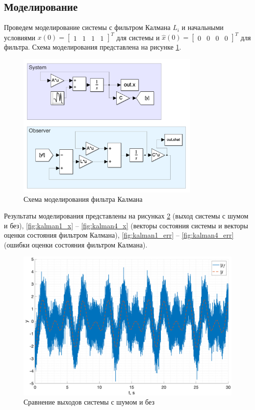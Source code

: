 \subsection{Моделирование}
Проведем моделирование системы с фильтром Калмана $L_i$ и начальными условиями $x(0) = \begin{bmatrix} 1 & 1 & 1 & 1 \end{bmatrix}^T$ для 
системы и $\hat{x}(0) = \begin{bmatrix} 0 & 0 & 0 & 0 \end{bmatrix}^T$ для фильтра. Схема моделирования представлена на рисунке \ref{fig:kalman_scheme}.
\begin{figure}[ht!]
    \centering
    \includegraphics[width=0.8\textwidth]{media/kalman_scheme.png}
    \caption{Схема моделирования фильтра Калмана}
    \label{fig:kalman_scheme}
\end{figure}
Результаты моделирования представлены на рисунках \ref{fig:kalman1_y} (выход системы с шумом и без),
\ref{fig:kalman1_x} -- \ref{fig:kalman4_x} (векторы состояния системы и векторы оценки состояния фильтром Калмана), 
\ref{fig:kalman1_err} -- \ref{fig:kalman4_err} (ошибки оценки состояния фильтром Калмана). 
\begin{figure}[ht!]
    \centering
    \includegraphics[width=\textwidth]{media/plots/kalman_task2/y_cmp_1.png}
    \caption{Сравнение выходов системы с шумом и без} 
    \label{fig:kalman1_y}
\end{figure}

